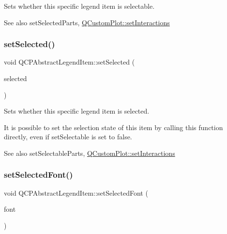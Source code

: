 Sets whether this specific legend item is selectable.

\begin{DoxySeeAlso}{See also}
set\+Selected\+Parts, \mbox{\hyperlink{class_q_custom_plot_a5ee1e2f6ae27419deca53e75907c27e5}{Q\+Custom\+Plot\+::set\+Interactions}} 
\end{DoxySeeAlso}
\mbox{\label{class_q_c_p_abstract_legend_item_a6eed93b0ab99cb3eabb043fb08179c2b}} 
\subsubsection{\texorpdfstring{setSelected()}{setSelected()}}
{\footnotesize\ttfamily void Q\+C\+P\+Abstract\+Legend\+Item\+::set\+Selected (\begin{DoxyParamCaption}\item[{bool}]{selected }\end{DoxyParamCaption})}

Sets whether this specific legend item is selected.

It is possible to set the selection state of this item by calling this function directly, even if set\+Selectable is set to false.

\begin{DoxySeeAlso}{See also}
set\+Selectable\+Parts, \mbox{\hyperlink{class_q_custom_plot_a5ee1e2f6ae27419deca53e75907c27e5}{Q\+Custom\+Plot\+::set\+Interactions}} 
\end{DoxySeeAlso}
\mbox{\label{class_q_c_p_abstract_legend_item_a91db5aee48617a9d3206e61376807365}} 
\subsubsection{\texorpdfstring{setSelectedFont()}{setSelectedFont()}}
{\footnotesize\ttfamily void Q\+C\+P\+Abstract\+Legend\+Item\+::set\+Selected\+Font (\begin{DoxyParamCaption}\item[{const Q\+Font \&}]{font }\end{DoxyParamCaption})}

